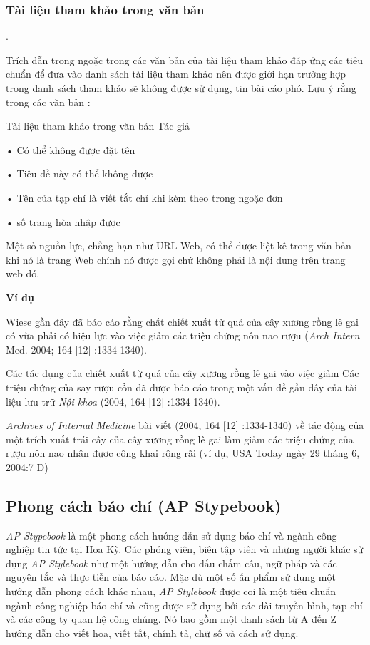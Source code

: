 \documentclass{hcmutarticle}
\begin{document}
\subsubsection{Tài liệu tham khảo trong văn bản}.


Trích dẫn trong ngoặc trong các văn bản của tài liệu tham khảo đáp ứng các tiêu chuẩn để đưa vào danh sách tài liệu tham khảo nên được giới hạn trường hợp trong danh sách tham khảo sẽ không được sử dụng, tin bài cáo phó. Lưu ý rằng trong các văn bản :

Tài liệu tham khảo trong văn bản Tác giả 

• Có thể không được đặt tên 

• Tiêu đề này có thể không được 

• Tên của tạp chí là viết tắt chỉ khi kèm theo trong ngoặc đơn

 • số trang hòa nhập được 
 
Một số nguồn lực, chẳng hạn như URL Web, có thể được liệt kê trong văn bản khi nó là trang Web chính nó được gọi chứ không phải là nội dung trên trang web đó.

{\bfseries Ví dụ}

Wiese gần đây đã báo cáo rằng chất chiết xuất từ quả của cây xương rồng lê gai có vừa phải có hiệu lực vào việc giảm các triệu chứng nôn nao rượu ({\itshape Arch Intern} Med. 2004; 164 [12] :1334-1340). 

Các tác dụng của chiết xuất từ quả của cây xương rồng lê gai vào việc giảm Các triệu chứng của say rượu cồn đã được báo cáo trong một vấn đề gần đây của tài liệu lưu trữ {\itshape Nội khoa} (2004, 164 [12] :1334-1340). 

{\itshape Archives of Internal Medicine} bài viết (2004, 164 [12] :1334-1340) về tác động của một trích xuất trái cây của cây xương rồng lê gai làm giảm các triệu chứng của rượu nôn nao nhận được công khai rộng rãi (ví dụ, USA Today ngày 29 tháng 6, 2004:7 D)

\subsection{Phong cách báo chí (AP Stypebook)}

{\em AP Stypebook} là một phong cách hướng dẫn sử dụng báo chí và ngành công nghiệp tin tức tại Hoa Kỳ. Các phóng viên, biên tập viên và những người khác sử dụng {\em AP Stylebook} như một hướng dẫn cho dấu chấm câu, ngữ pháp và các nguyên tắc và thực tiễn của báo cáo. Mặc dù một số ấn phẩm sử dụng một hướng dẫn phong cách khác nhau, {\em AP Stylebook} được coi là một tiêu chuẩn ngành công nghiệp báo chí và cũng được sử dụng bởi các đài truyền hình, tạp chí và các công ty quan hệ công chúng. Nó bao gồm một danh sách từ A đến Z hướng dẫn cho viết hoa, viết tắt, chính tả, chữ số và cách sử dụng.
\end{document}
